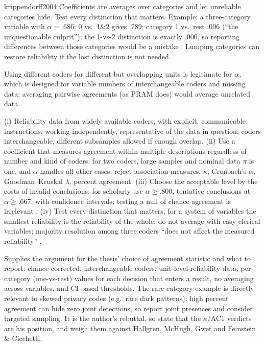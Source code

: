 \begin{papercard}{krippendorff2004}
 Coefficients are averages over categories and let unreliable categories hide. Test every distinction that matters. Example: a three-category variable with $\alpha=.686$; 0 vs.\ 1\&2 gives .789; category 1 vs.\ rest .006 (``the unquestionable culprit''); the 1-vs-2 distinction is exactly .000, so reporting differences between those categories would be a mistake . Lumping categories can restore reliability if the lost distinction is not needed.

 Using different coders for different but overlapping units is legitimate for $\alpha$, which is designed for variable numbers of interchangeable coders and missing data; averaging pairwise agreements (as PRAM does) would average unrelated data .

 (i) Reliability data from widely available coders, with explicit, communicable instructions, working independently, representative of the data in question; coders interchangeable, different subsamples allowed if enough overlap. (ii) Use a coefficient that measures agreement within multiple descriptions regardless of number and kind of coders; for two coders, large samples and nominal data $\pi$ is one, and $\alpha$ handles all other cases; reject association measures, $\kappa$, Cronbach's $\alpha$, Goodman--Kruskal $\lambda$, percent agreement. (iii) Choose the acceptable level by the costs of invalid conclusions: for scholarly use $\alpha\ge.800$, tentative conclusions at $\alpha\ge.667$, with confidence intervals; testing a null of chance agreement is irrelevant . (iv) Test every distinction that matters; for a system of variables the smallest reliability is the reliability of the whole; do not average with easy clerical variables; majority resolution among three coders ``does not affect the measured reliability'' .

 Supplies the argument for the thesis' choice of agreement statistic and what to report: chance-corrected, interchangeable coders, unit-level reliability data, per-category (one-vs-rest) values for each decision that enters a result, no averaging across variables, and CI-based thresholds. The rare-category example is directly relevant to skewed privacy codes (e.g.\ rare dark patterns): high percent agreement can hide zero joint detections, so report joint presences and consider targeted sampling. It is the author's rebuttal, so state that the $\kappa$/AC1 verdicts are his position, and weigh them against Hallgren, McHugh, Gwet and Feinstein \& Cicchetti.
\end{papercard}

